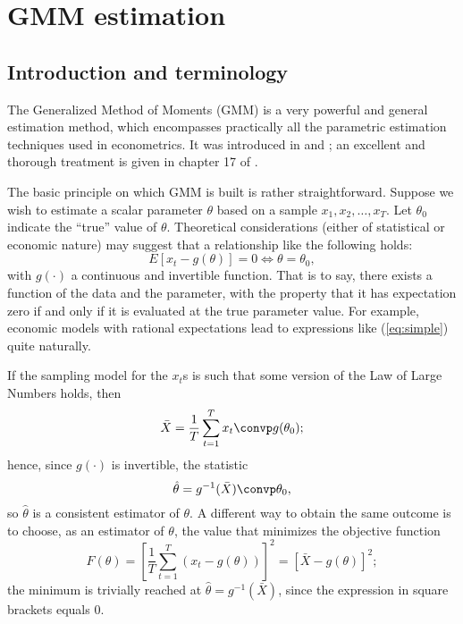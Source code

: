 \chapter{GMM estimation}
\label{chap:gmm}

\section{Introduction and terminology}
\label{sec:gmm-intro}

The Generalized Method of Moments (GMM) is a very powerful and general
estimation method, which encompasses practically all the parametric
estimation techniques used in econometrics. It was introduced in
\cite{hansen82} and \cite{hansen-singleton82}; an excellent and
thorough treatment is given in chapter 17 of
\cite{davidson-mackinnon93}.

The basic principle on which GMM is built is rather straightforward.
Suppose we wish to estimate a scalar parameter $\theta$ based on
a sample $x_1, x_2, \ldots, x_T$.  Let $\theta_0$ indicate the ``true''
value of $\theta$. Theoretical considerations (either of statistical
or economic nature) may suggest that a relationship like the following
holds:
\begin{equation}
  \label{eq:simple}
  E \left[ x_t - g(\theta) \right] = 0 \Leftrightarrow \theta =
  \theta_0 ,
\end{equation}
with $g(\cdot)$ a continuous and invertible function. That is to say,
there exists a function of the data and the parameter, with the
property that it has expectation zero if and only if it is evaluated
at the true parameter value.  For example, economic models with
rational expectations lead to expressions like (\ref{eq:simple}) quite
naturally.

If the sampling model for the $x_t$s is such that some version of the
Law of Large Numbers holds, then
\[
  \bar{X} = \frac{1}{T} \sum_{t=1}^T x_t \convp g(\theta_0) ;
\]
hence, since $g(\cdot)$ is invertible, the statistic
\[
  \hat{\theta} = g^{-1}(\bar{X}) \convp \theta_0 ,
\]
so $\hat{\theta}$ is a consistent estimator of $\theta$. A different
way to obtain the same outcome is to choose, as an estimator of
$\theta$, the value that minimizes the objective function
\begin{equation}
  \label{eq:obj-simple}
  F(\theta) = \left[ \frac{1}{T} \sum_{t=1}^T (x_t  - g(\theta)) \right]^2 =
  \left[ \bar{X} - g(\theta) \right]^2 ;
\end{equation}
the minimum is trivially reached at $\hat{\theta} = g^{-1}(\bar{X})$,
since the expression in square brackets equals 0.

